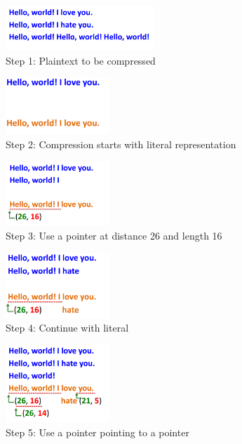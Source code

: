 \begin{figure}[H] \caption{Step 1: Plaintext to be compressed} \centering
\includegraphics[width=0.5\textwidth]{diagrams/lz77_1.png}\end{figure}
\begin{figure}[H] \caption{Step 2: Compression starts with literal
representation} \centering
\includegraphics[width=0.35\textwidth]{diagrams/lz77_2.png}\end{figure}
\begin{figure}[H] \caption{Step 3: Use a pointer at distance 26 and length 16}
\centering
\includegraphics[width=0.35\textwidth]{diagrams/lz77_3.png}\end{figure}
\begin{figure}[H] \caption{Step 4: Continue with literal} \centering
\includegraphics[width=0.35\textwidth]{diagrams/lz77_4.png}\end{figure}
\begin{figure}[H] \caption{Step 5: Use a pointer pointing to a pointer}
\centering
\includegraphics[width=0.35\textwidth]{diagrams/lz77_5.png}\end{figure}
